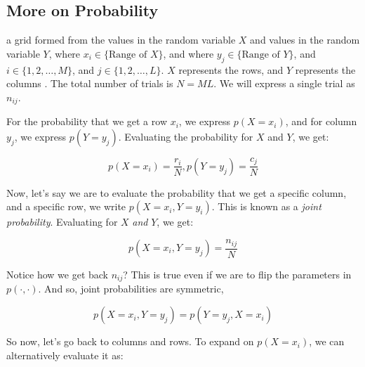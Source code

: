 \documentclass{tufte-handout}
\begin{document}
\subsection{More on Probability}

 a grid formed from the values in the random variable $X$
and values in the random variable $Y$, where $x_i \in \{\text{Range of } X\}$,
and where $y_j \in \{\text{Range of } Y\}$, and $i \in \{ 1, 2, \ldots, M \}$,
and $j \in \{ 1, 2, \ldots, L \}$. $X$ represents the rows, and $Y$ represents
the columns . The total number of trials is $N = ML$. We
will express a single trial as $n_{ij}$.

For the probability that we get a row $x_i$, we express $p(X = x_i)$, and for
column $y_j$, we express $p(Y = y_j)$. Evaluating the probability for $X$ and
$Y$, we get:

\begin{equation} \label{equation:probbasic}
  p(X = x_i) = \frac{r_i}{N}, p(Y = y_j) = \frac{c_j}{N}
\end{equation}


Now, let's say we are to evaluate the probability that we get a specific column,
and a specific row, we write $p(X = x_i, Y = y_i)$. This is known as a
\emph{joint probability}. Evaluating for $X$ \emph{and} $Y$, we get:

\begin{equation} \label{equation:jointprob}
  p(X = x_i, Y = y_j) = \frac{n_{ij}}{N}
\end{equation}

Notice how we get back $n_{ij}$? This is true even if we are to flip the
parameters in $p(\cdot, \cdot)$. And so, joint probabilities are symmetric,

\begin{equation}\label{equation:probabilitysymmetry}
  p(X = x_i, Y = y_j) = p(Y = y_j, X = x_i)
\end{equation}

So now, let's go back to columns and rows. To expand on $p(X = x_i)$, we can
alternatively evaluate it as:
\end{document}

